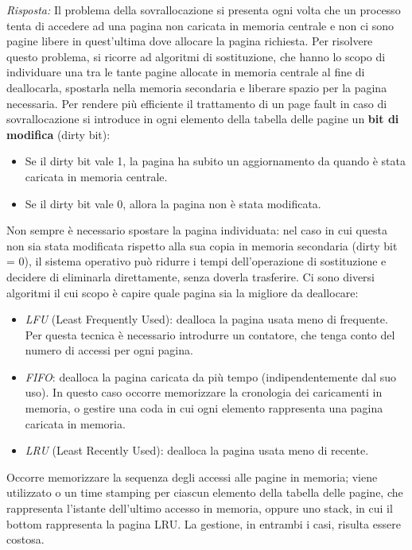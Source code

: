 \documentclass{article}
\newenvironment{solution}
    {\textit{Risposta:}}
    {}
\begin{document}
\begin{solution}
Il problema della sovrallocazione si presenta ogni volta che un processo tenta di accedere ad una pagina non caricata in memoria centrale e non ci sono pagine libere in quest’ultima dove allocare la pagina richiesta.
\newline
Per risolvere questo problema, si ricorre ad algoritmi di sostituzione, che hanno lo scopo di individuare una tra le tante pagine allocate in memoria centrale al fine di deallocarla, spostarla nella memoria secondaria e liberare spazio per la pagina necessaria.
\newline
Per rendere più efficiente il trattamento di un page fault in caso di sovrallocazione si introduce in ogni elemento della tabella delle pagine un \textbf{bit di modifica} (dirty bit):
\begin{itemize}
    \item Se il dirty bit vale 1, la pagina ha subito un aggiornamento da quando è stata caricata in memoria centrale. 
    \item Se il dirty bit vale 0, allora la pagina non è stata modificata.
\end{itemize}
Non sempre è necessario spostare la pagina individuata: nel caso in cui questa non sia stata modificata rispetto alla sua copia in memoria secondaria (dirty bit = 0), il sistema operativo può ridurre i tempi dell’operazione di sostituzione e decidere di eliminarla direttamente, senza doverla trasferire.
\newline
Ci sono diversi algoritmi il cui scopo è capire quale pagina sia la migliore da deallocare:
\begin{itemize}
    \item \emph{LFU} (Least Frequently Used): dealloca la pagina usata meno di frequente.\newline
    Per questa tecnica è necessario introdurre un contatore, che tenga conto del numero di accessi per ogni pagina.
    \item \emph{FIFO}: dealloca la pagina caricata da più tempo (indipendentemente dal suo uso).
In questo caso occorre memorizzare la cronologia dei caricamenti in memoria, o gestire una coda in cui ogni elemento rappresenta una pagina caricata in memoria.
    \item \emph{LRU} (Least Recently Used): dealloca la pagina usata meno di recente.
\end{itemize}
Occorre memorizzare la sequenza degli accessi alle pagine in memoria; viene utilizzato o un time stamping per ciascun elemento della tabella delle pagine, che rappresenta l’istante dell’ultimo accesso in memoria, oppure uno stack, in cui il bottom rappresenta la pagina LRU.
\newline
La gestione, in entrambi i casi, risulta essere costosa.
\end{solution}
\end{document}
